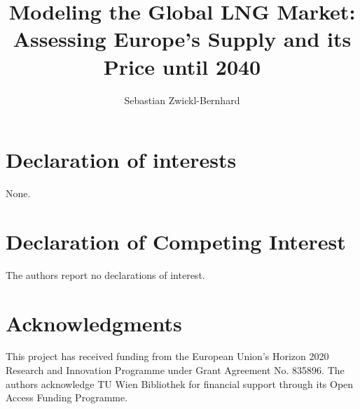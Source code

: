 \documentclass[review]{elsarticle}
\begin{document}
\begin{frontmatter}

\title{Modeling the Global LNG Market:\\Assessing Europe's Supply and its Price until 2040}
\author[1,2]{Sebastian Zwickl-Bernhard}
\address[1]{Energy Economics Group (EEG), Technische Universität Wien, Gusshausstrasse 25-29/E370-3, 1040 Wien, Austria}
\address[2]{Department of Industrial Economics and Technology Management, \protect\\ The Norwegian University of Science and Technology, Trondheim, Norway}


\begin{abstract}
\end{abstract}

\begin{keyword}	
\end{keyword}
\end{frontmatter}
\newpage

%
%
%
%

\section*{Declaration of interests}
None.
\section*{Declaration of Competing Interest}
The authors report no declarations of interest.
\section*{Acknowledgments}
This project has received funding from the European Union's Horizon 2020 Research and Innovation Programme under Grant Agreement No. 835896. The authors acknowledge TU Wien Bibliothek for financial support through its Open Access Funding Programme.

\appendix
\setcounter{table}{0}
\setcounter{figure}{0}
\end{document}
